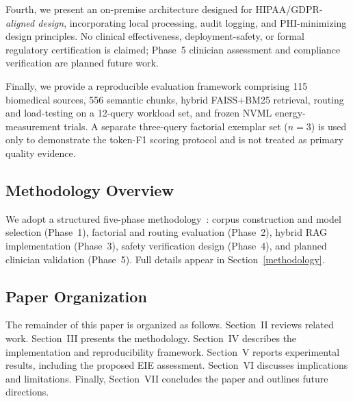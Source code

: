 Fourth, we present an on-premise architecture designed for HIPAA/GDPR-\emph{aligned design}, incorporating local processing, audit logging, and PHI-minimizing design principles. No clinical effectiveness, deployment-safety, or formal regulatory certification is claimed; Phase~5 clinician assessment and compliance verification are planned future work.

Finally, we provide a reproducible evaluation framework comprising 115 biomedical sources, 556 semantic chunks, hybrid FAISS+BM25 retrieval, routing and load-testing on a 12-query workload set, and frozen NVML energy-measurement trials. A separate three-query factorial exemplar set ($n{=}3$) is used only to demonstrate the token-F1 scoring protocol and is not treated as primary quality evidence.

\subsection{Methodology Overview}

We adopt a structured five-phase methodology~\cite{tam2024quest}: corpus construction and model selection (Phase~1), factorial and routing evaluation (Phase~2), hybrid RAG implementation (Phase~3), safety verification design (Phase~4), and planned clinician validation (Phase~5). Full details appear in Section~\ref{methodology}.

\subsection{Paper Organization}

The remainder of this paper is organized as follows. Section~II reviews related work. Section~III presents the methodology. Section~IV describes the implementation and reproducibility framework. Section~V reports experimental results, including the proposed EIE assessment. Section~VI discusses implications and limitations. Finally, Section~VII concludes the paper and outlines future directions.